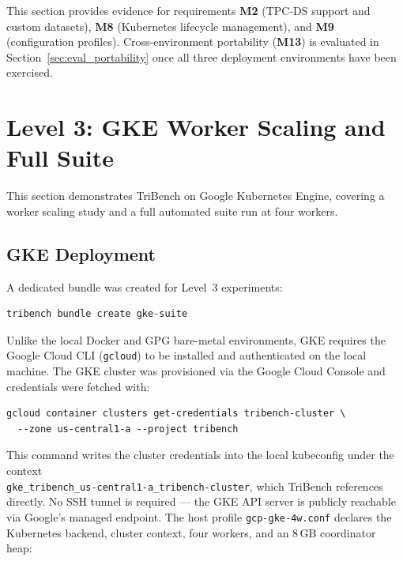 \documentclass{l4proj}
\begin{document}

This section provides evidence for requirements \textbf{M2} (TPC-DS support and custom datasets), \textbf{M8} (Kubernetes lifecycle management), and \textbf{M9} (configuration profiles). Cross-environment portability (\textbf{M13}) is evaluated in Section~\ref{sec:eval_portability} once all three deployment environments have been exercised.

\section{Level 3: GKE Worker Scaling and Full Suite}
\label{sec:eval_l3}

This section demonstrates TriBench on Google Kubernetes Engine, covering a worker scaling study and a full automated suite run at four workers.

\subsection{GKE Deployment}
\label{sec:eval_gke_deploy}

A dedicated bundle was created for Level~3 experiments:

\begin{verbatim}
tribench bundle create gke-suite
\end{verbatim}

\noindent Unlike the local Docker and GPG bare-metal environments, GKE requires the Google Cloud CLI (\texttt{gcloud}) to be installed and authenticated on the local machine. The GKE cluster was provisioned via the Google Cloud Console and credentials were fetched with:

\begin{verbatim}
gcloud container clusters get-credentials tribench-cluster \
  --zone us-central1-a --project tribench
\end{verbatim}

\noindent This command writes the cluster credentials into the local kubeconfig under the context \\ \texttt{gke\_tribench\_us-central1-a\_tribench-cluster}, which TriBench references directly. No SSH tunnel is required --- the GKE API server is publicly reachable via Google's managed endpoint. The host profile \texttt{gcp-gke-4w.conf} declares the Kubernetes backend, cluster context, four workers, and an 8\,GB coordinator heap:
\end{document}
